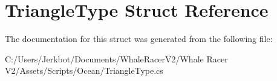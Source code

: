 \hypertarget{struct_triangle_type}{}\section{Triangle\+Type Struct Reference}
\label{struct_triangle_type}


The documentation for this struct was generated from the following file\+:\begin{DoxyCompactItemize}
\item 
C\+:/\+Users/\+Jerkbot/\+Documents/\+Whale\+Racer\+V2/\+Whale Racer V2/\+Assets/\+Scripts/\+Ocean/Triangle\+Type.\+cs\end{DoxyCompactItemize}
